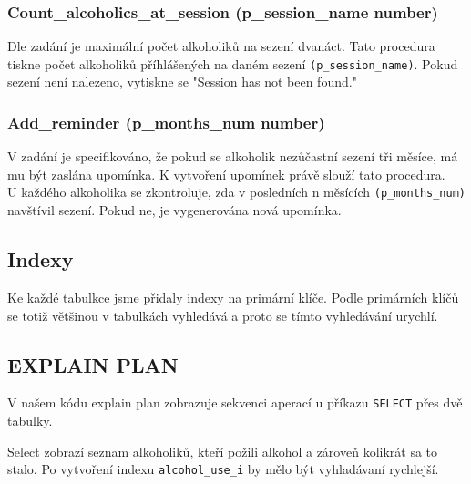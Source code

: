 \documentclass[11pt, a4paper]{article}
\begin{document}
\subsubsection*{Count\_alcoholics\_at\_session (p\_session\_name number)}
Dle zadání je maximální počet alkoholiků na sezení dvanáct. Tato procedura tiskne počet alkoholiků příhlášených na daném sezení \texttt{(p\_session\_name)}. Pokud sezení není nalezeno, vytiskne se "Session has not been found."

\subsubsection*{Add\_reminder (p\_months\_num number)}
V zadání je specifikováno, že pokud se alkoholik nezůčastní sezení tři měsíce, má mu být zaslána upomínka. K vytvoření upomínek právě slouží tato procedura.\\

U každého alkoholika se zkontroluje, zda v posledních n měsících \texttt{(p\_months\_num)} navštívil sezení. Pokud ne, je vygenerována nová upomínka.

\subsection{Indexy}
Ke každé tabulkce jsme přidaly indexy na primární klíče. Podle primárních klíčů se totiž většinou v tabulkách vyhledává a proto se tímto vyhledávání urychlí.

\subsection{EXPLAIN PLAN}
V našem kódu explain plan zobrazuje sekvenci aperací u příkazu \texttt{SELECT} přes dvě tabulky.

Select zobrazí seznam alkoholiků, kteří požili alkohol a zároveň kolikrát sa to stalo. Po vytvoření indexu \texttt{alcohol\_use\_i} by mělo být vyhladávaní rychlejší. 
\end{document}
